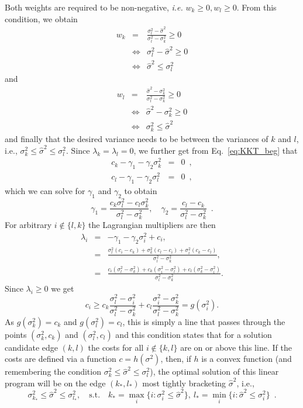 \documentclass{article}
\numberwithin{equation}{section}
\newcommand{\ie}{{i.e.}}
\begin{document}
Both weights are required to be non-negative, \emph{i.e.}  $w_k\geq 0,w_l\geq 0$. From this condition, we obtain
\begin{eqnarray}
  w_k&=&\frac{\sigma_l^2-\hat{\sigma}^2}{\sigma_l^2-\sigma_k^2}\geq 0 \\
  &\Leftrightarrow& \sigma_l^2-\hat{\sigma}^2\geq 0 \\
  &\Leftrightarrow& \hat{\sigma}^2\leq \sigma_l^2
\end{eqnarray}
and
\begin{eqnarray}
  w_l&=&\frac{\hat{\sigma}^2-\sigma_k^2}{\sigma_l^2-\sigma_k^2}\geq 0 \\
  &\Leftrightarrow& \hat{\sigma}^2-\sigma_k^2\geq 0 \\
  &\Leftrightarrow& \sigma_k^2\leq \hat{\sigma}^2
\end{eqnarray}
and finally that the desired variance needs to be between the variances of $k$ and $l$, \ie, $\sigma_k^2\leq\hat{\sigma}^2\leq\sigma_l^2$. Since $\lambda_k=\lambda_l=0$, we further get from Eq.~\eqref{eq:KKT_beg} that
\begin{eqnarray}
  c_k -\gamma_1 -\gamma_2 \sigma_k^2 &=& 0\enspace,\\
  c_l -\gamma_1 -\gamma_2 \sigma_l^2 &=& 0\enspace,
\end{eqnarray}
which we can solve for $\gamma_1$ and $\gamma_2$ to obtain
\begin{equation}
  \gamma_1 = \frac{c_k\sigma_l^2-c_l\sigma_k^2}{\sigma_l^2-\sigma_k^2},\quad \gamma_2 = \frac{c_l-c_k}{\sigma_l^2-\sigma_k^2}\enspace.
\end{equation}
For arbitrary $i\notin\{l,k\}$ the Lagrangian multipliers are then
\begin{eqnarray}
  \lambda_i &=& -\gamma_1 -\gamma_2 \sigma_i^2 + c_i, \\
  &=& \frac{\sigma_l^2(c_i-c_k)+\sigma_k^2(c_l-c_i)+\sigma_i^2(c_k-c_l)}{\sigma_l^2-\sigma_k^2}, \\
  &=& \frac{c_i(\sigma_l^2-\sigma_k^2)+c_k(\sigma_i^2-\sigma_l^2)+c_l(\sigma_k^2-\sigma_i^2)}{\sigma_l^2-\sigma_k^2}.
\end{eqnarray}
Since $\lambda_i\geq 0$ we get
\begin{equation}
  c_i\geq c_k\frac{\sigma_l^2-\sigma_i^2}{\sigma_l^2-\sigma_k^2} + c_l\frac{\sigma_i^2-\sigma_k^2}{\sigma_l^2-\sigma_k^2} = g(\sigma_i^2).
\end{equation}
As $g(\sigma_k^2)=c_k$ and $g(\sigma_l^2)=c_l$, this is simply a line that passes through the points $(\sigma_k^2,c_k)$ and $(\sigma_l^2,c_l)$ and this condition states that for a solution candidate edge $(k,l)$ the costs for all $i\notin\{k,l\}$ are on or above this line. If the costs are defined via a function $c=h(\sigma^2)$, then, if $h$ is a convex function (and remembering the condition $\sigma_k^2\leq \hat{\sigma}^2\leq \sigma_l^2$), the optimal solution of this linear program will be on the edge $(k_*,l_*)$ most tightly bracketing $\hat{\sigma}^2$, \ie,
\begin{equation}
  \sigma_{k_*}^2\leq \hat{\sigma}^2\leq \sigma_{l_*}^2,\quad\text{s.t.}\quad k_* = \max_i \{i:\sigma_i^2\leq \hat{\sigma}^2\},~l_* = \min_i \{i:\hat{\sigma}^2\leq \sigma_i^2\}\enspace.
\end{equation}
\end{document}
